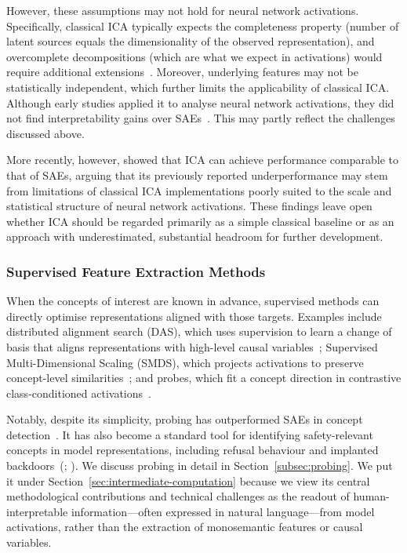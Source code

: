 However, these assumptions may not hold for neural network activations. Specifically, classical ICA typically expects the completeness property (number of latent sources equals the dimensionality of the observed representation), and overcomplete decompositions (which are what we expect in activations) would require additional extensions~. Moreover, underlying features may not be statistically independent, which further limits the applicability of classical ICA. Although early studies applied it to analyse neural network activations, they did not find interpretability gains over SAEs~. This may partly reflect the challenges discussed above.

More recently, however,  showed that ICA can achieve performance comparable to that of SAEs, arguing that its previously reported underperformance may stem from limitations of classical ICA implementations poorly suited to the scale and statistical structure of neural network activations. These findings leave open whether ICA should be regarded primarily as a simple classical baseline or as an approach with underestimated, substantial headroom for further development.

\subsubsection{Supervised Feature Extraction Methods}
\label{subsubsec: supervised_extraction}

When the concepts of interest are known in advance, supervised methods can directly optimise representations aligned with those targets. Examples include distributed alignment search (DAS), which uses supervision to learn a change of basis that aligns representations with high-level causal variables~; Supervised Multi-Dimensional Scaling (SMDS), which projects activations to preserve concept-level similarities~; and probes, which fit a concept direction in contrastive class-conditioned activations~.

Notably, despite its simplicity, probing has outperformed SAEs in concept detection~. It has also become a standard tool for identifying safety-relevant concepts in model representations, including refusal behaviour and implanted backdoors~(; ). We discuss probing in detail in Section~\ref{subsec:probing}. We put it under Section~\ref{sec:intermediate-computation} because we view its central methodological contributions and technical challenges as the readout of human-interpretable information---often expressed in natural language---from model activations, rather than the extraction of monosemantic features or causal variables.

